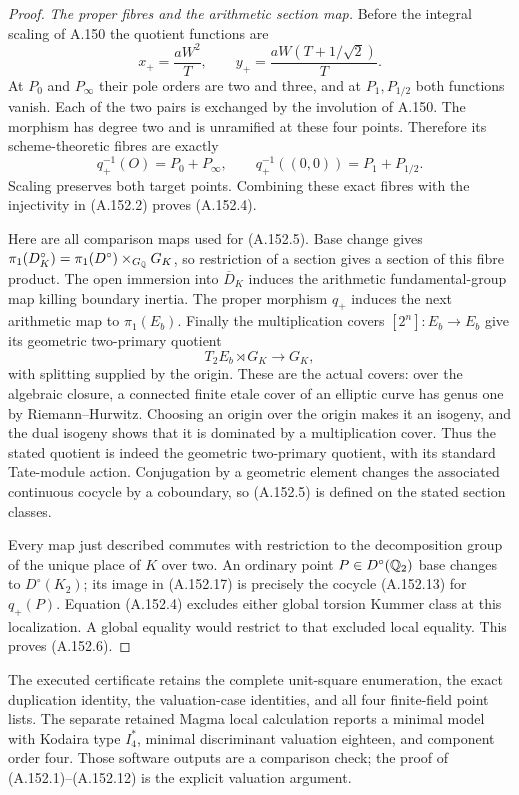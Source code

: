 \begin{proof}
\emph{The proper fibres and the arithmetic section map.}
Before the integral scaling of A.150 the quotient functions
are
\[
              x_+=\frac{aW^2}{T},\qquad
              y_+=\frac{aW(T+1/\sqrt2)}{T}.
\tag{A.152.15}
\]
At \(P_0\) and \(P_\infty\) their pole orders are
two and three, and at \(P_1,P_{1/2}\) both functions
vanish.  Each of the two pairs is exchanged by the
involution of A.150.  The morphism has degree two and
is unramified at these four points.  Therefore its
scheme-theoretic fibres are exactly
\[
                q_+^{-1}(O)=P_0+P_\infty,
              \qquad q_+^{-1}((0,0))=P_1+P_{1/2}.
\tag{A.152.16}
\]
Scaling preserves both target points.
Combining these exact fibres with the injectivity in
(A.152.2) proves (A.152.4).

Here are all comparison maps used for (A.152.5).
Base change gives
\(\pi_1(D^\circ_K)=\pi_1(D^\circ)\times_{G_\mathbb Q}G_K\),
so restriction of a section gives a section of this
fibre product.
The open immersion into \(\overline D_K\) induces
the arithmetic fundamental-group map killing boundary
inertia.  The proper morphism \(q_+\) induces the next
arithmetic map to \(\pi_1(E_b)\).
Finally the multiplication covers \([2^n]:E_b\to E_b\)
give its geometric two-primary quotient
\[
                  T_2E_b\rtimes G_K\longrightarrow G_K,
\tag{A.152.17}
\]
with splitting supplied by the origin.
These are the actual covers: over the algebraic closure,
a connected finite etale cover of an elliptic curve has
genus one by Riemann--Hurwitz.  Choosing an origin over
the origin makes it an isogeny, and the dual isogeny
shows that it is dominated by a multiplication cover.
Thus the stated quotient is indeed the geometric
two-primary quotient, with its standard Tate-module action.
Conjugation by a geometric element changes the associated
continuous cocycle by a coboundary, so (A.152.5) is defined
on the stated section classes.

Every map just described commutes with restriction to
the decomposition group of the unique place of \(K\)
over two.  An ordinary point \(P\in D^\circ(\mathbb Q_2)\)
base changes to \(D^\circ(K_2)\); its image in
(A.152.17) is precisely the cocycle (A.152.13) for
\(q_+(P)\).
Equation (A.152.4) excludes either global torsion
Kummer class at this localization.  A global equality
would restrict to that excluded local equality.
This proves (A.152.6).
\end{proof}

The executed certificate
retains the complete unit-square enumeration, the exact
duplication identity, the valuation-case identities, and
all four finite-field point lists.
The separate retained Magma local calculation reports a
minimal model with Kodaira type \(I_4^*\), minimal
discriminant valuation eighteen, and component order four.
Those software outputs are a comparison check; the proof
of (A.152.1)--(A.152.12) is the explicit valuation argument.
